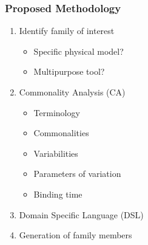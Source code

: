\documentclass[t,12pt,numbers,fleqn]{beamer}
\begin{document}

\begin{frame}

\frametitle{Proposed Methodology}

\begin{enumerate}

\item Identify family of interest
\begin{itemize}
\item Specific physical model?
\item Multipurpose tool?
\end{itemize}
\item Commonality Analysis (CA)
\begin{itemize}
\item Terminology
\item Commonalities
\item Variabilities
\item Parameters of variation
\item Binding time
\end{itemize}
\item Domain Specific Language (DSL)
\item Generation of family members

\end{enumerate}

\end{frame}

\end{document}
